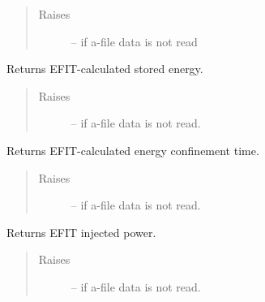 \documentclass[letterpaper,10pt,english]{sphinxmanual}
\begin{document}
\begin{fulllineitems}
\begin{fulllineitems}
\begin{quote}
\begin{description}
\item[{Raises }] \leavevmode
{} -- 
if a-file data is not read

\end{description}\end{quote}

\end{fulllineitems}


\begin{fulllineitems}
\label{eqtools:eqtools.eqdskreader.EqdskReader.getWMHD}
Returns EFIT-calculated stored energy.
\begin{quote}\begin{description}
\item[{Raises }] \leavevmode
{} -- 
if a-file data is not read.

\end{description}\end{quote}

\end{fulllineitems}


\begin{fulllineitems}
\label{eqtools:eqtools.eqdskreader.EqdskReader.getTauMHD}
Returns EFIT-calculated energy confinement time.
\begin{quote}\begin{description}
\item[{Raises }] \leavevmode
{} -- 
if a-file data is not read.

\end{description}\end{quote}

\end{fulllineitems}


\begin{fulllineitems}
\label{eqtools:eqtools.eqdskreader.EqdskReader.getPinj}
Returns EFIT injected power.
\begin{quote}\begin{description}
\item[{Raises }] \leavevmode
{} -- 
if a-file data is not read.


\end{description}
\end{quote}
\end{fulllineitems}
\end{fulllineitems}
\end{document}
